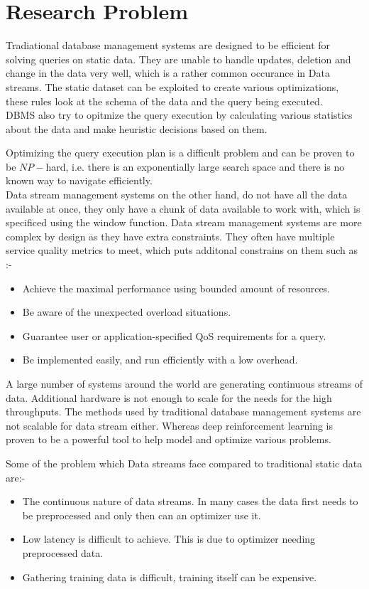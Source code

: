 \section{Research Problem}
\label{sec:Problem at hand}
Tradiational database management systems are designed to be efficient for solving queries on static data. They are unable to handle updates, deletion and change in the data very well, which is a rather common occurance in Data streams. The static dataset can be exploited to create various optimizations, these rules look at the schema of the data and the query being executed.\\
DBMS also try to opitmize the query execution by calculating various statistics about the data and make heuristic decisions based on them.    
\par Optimizing the query execution plan is a difficult problem and can be proven to be $NP-$hard, i.e. there is an exponentially large search space and there is no known way to navigate efficiently.\\
Data stream management systems on the other hand, do not have all the data available at once, they only have a chunk of data available to work with, which is specificed using the window function. Data stream management systems are more complex by design as they have extra constraints. They often have multiple service quality metrics to meet, which puts additonal constrains on them such as\cite{stream_optimization} :-
\begin{itemize}
    \item Achieve the maximal performance using bounded amount of resources.
    \item Be aware of the unexpected overload situations.
    \item Guarantee user or application-specified QoS requirements for a query.
    \item Be implemented easily, and run efficiently with a low overhead.
\end{itemize}
\par A large number of systems around the world are generating continuous streams of data. Additional hardware is not enough to scale for the needs for the high throughputs. The methods used by traditional database management systems are not scalable for data stream either. Whereas deep reinforcement learning is proven to be a powerful tool to help model and optimize various problems.
\par Some of the problem which Data streams face compared to traditional static data are:-
\begin{itemize}
    \item The continuous nature of data streams. In many cases the data first needs to be preprocessed and only then can an optimizer use it.
    \item Low latency is difficult to achieve. This is due to optimizer needing preprocessed data.
    \item Gathering training data is difficult, training itself can be expensive.
\end{itemize}

